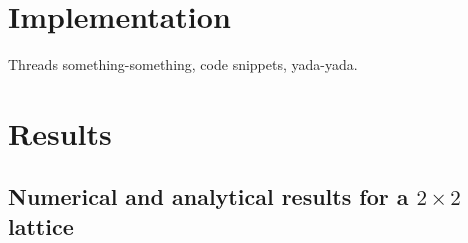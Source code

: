 \documentclass[12pt,english,a4paper]{article}
\begin{document}
\section{Implementation}
Threads something-something, code snippets, yada-yada.

\section{Results}


\subsection{Numerical and analytical results for a \(2\times2\) lattice}

\end{document}
